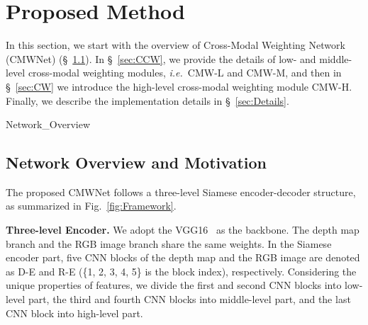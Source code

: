 \documentclass[runningheads]{llncs}
\newcommand{\ie}{\emph{i.e.}}
\begin{document}
\section{Proposed Method}
\label{sec:OurMethod}

In this section, we start with the overview of Cross-Modal
Weighting Network (CMWNet) (\S~\ref{sec:Overview}).
In \S~\ref{sec:CCW}, we provide the details of low- and middle-level cross-modal
weighting modules, \ie~CMW-L and CMW-M, and then in \S~\ref{sec:CW} we introduce the high-level cross-modal
weighting module CMW-H.
Finally, we describe the implementation details in \S~\ref{sec:Details}.



\begin{figure*}[t!]
	\centering
	\begin{overpic}[width=\textwidth]{Network_Overview}
    \end{overpic}
\caption{\small \textbf{Illustration of the proposed CMWNet.}	
	For both RGB and depth channel, the Siamese encoder network is employed to extract feature blocks organized in three levels.
	Three Cross-Modal Weighting (CMW) modules, CMW-L, CMW-M and CMW-H, are proposed to capture the interactions at corresponding level, and provide inputs for the decoder. The decoder progressively aggregates all the cross-modal cross-scale information for the final prediction.
	For training, multi-scale pixel-level supervision for intermediate predictions are utilized.
    }
\label{fig:Framework}
\end{figure*}




\subsection{Network Overview and Motivation}
\label{sec:Overview}

The proposed CMWNet follows a three-level Siamese encoder-decoder structure, as summarized in Fig.~\ref{fig:Framework}.


\noindent\textbf{Three-level Encoder.}
We adopt the VGG16~\cite{2014VGG16ICLR} as the backbone.
The depth map branch and the RGB image branch share the same weights.
In the Siamese encoder part,
five CNN blocks of the depth map and the RGB image are
denoted as D-E and R-E (\{1, 2, 3, 4, 5\}
is the block index), respectively.
Considering the unique properties of features, we divide the first
and second CNN blocks into low-level part, the third and fourth CNN blocks
into middle-level part, and the last CNN block into high-level part.
\end{document}
